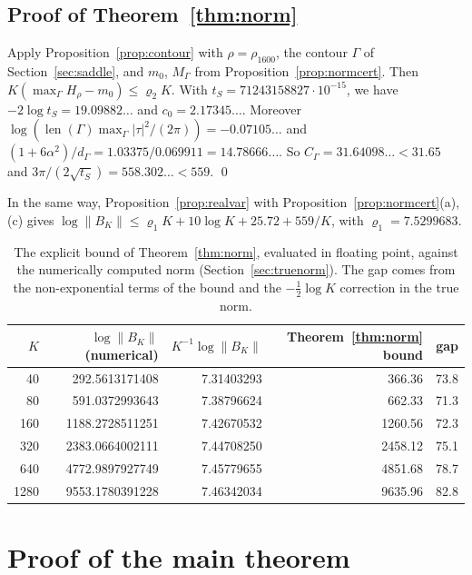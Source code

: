 \documentclass[11pt]{article}
\theoremstyle{remark}
\DeclareMathOperator{\len}{len}
\begin{document}
\subsection{Proof of Theorem~\ref{thm:norm}}

Apply Proposition~\ref{prop:contour} with $\rho=\rho_{1600}$, the contour $\Gamma$ of Section~\ref{sec:saddle}, and $m_0$, $M_\Gamma$ from Proposition~\ref{prop:normcert}. Then $K(\max_\Gamma H_\rho-m_0)\le\varrho_2K$. With $t_S=71243158827\cdot10^{-15}$, we have $-2\log t_S=19.09882\ldots$ and $c_0=2.17345\ldots$. Moreover $\log(\len(\Gamma)\max_\Gamma|\tau|^2/(2\pi))=-0.07105\ldots$ and $(1+6\alpha^2)/d_\Gamma=1.03375/0.069911=14.78666\ldots$. So $C_\Gamma=31.64098\ldots<31.65$ and $3\pi/(2\sqrt{t_S})=558.302\ldots<559$. \qed

\medskip
In the same way, Proposition~\ref{prop:realvar} with Proposition~\ref{prop:normcert}(a),(c) gives $\log\|B_K\|\le\varrho_1K+10\log K+25.72+559/K$, with $\varrho_1=7.5299683$.

\begin{table}[ht]
\centering
\begin{tabular}{rrrrr}
\toprule
$K$ & $\log\|B_K\|$ (numerical) & $K^{-1}\log\|B_K\|$ & Theorem~\ref{thm:norm} bound & gap\\
\midrule
40 & 292.5613171408 & 7.31403293 & 366.36 & 73.8\\
80 & 591.0372993643 & 7.38796624 & 662.33 & 71.3\\
160 & 1188.2728511251 & 7.42670532 & 1260.56 & 72.3\\
320 & 2383.0664002111 & 7.44708250 & 2458.12 & 75.1\\
640 & 4772.9897927749 & 7.45779655 & 4851.68 & 78.7\\
1280 & 9553.1780391228 & 7.46342034 & 9635.96 & 82.8\\
\bottomrule
\end{tabular}
\caption{The explicit bound of Theorem~\ref{thm:norm}, evaluated in floating point, against the numerically computed norm (Section~\ref{sec:truenorm}). The gap comes from the non-exponential terms of the bound and the $-\frac12\log K$ correction in the true norm.}
\label{tab:explicit}
\end{table}

\section{Proof of the main theorem}\label{sec:proof}
\end{document}
